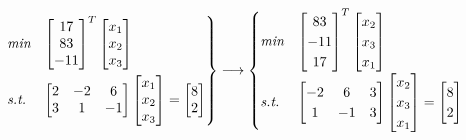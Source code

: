 \begin{enumerate}
	\begin{gather*}
		\begin{rcases}
			\textit{min} & \begin{bmatrix}
				17\\83\\-11
			\end{bmatrix}^T\begin{bmatrix}
				x_1\\ x_2\\x_3
			\end{bmatrix}\\
			\textit{s.t.} & \begin{bmatrix}
				2 & -2 & 6\\
				3 & 1 & -1
			\end{bmatrix}
			\begin{bmatrix}
				x_1\\x_2\\x_3
			\end{bmatrix} = \begin{bmatrix}
				8\\2
			\end{bmatrix}
		\end{rcases} \longrightarrow
		\begin{cases}
			\textit{min} & \begin{bmatrix}
				83\\-11\\17
			\end{bmatrix}^T\begin{bmatrix}
				x_2\\x_3\\x_1
			\end{bmatrix}\\
			\textit{s.t.} & \begin{bmatrix}
				-2 & 6 & 3\\
				1 & -1 & 3
			\end{bmatrix}
			\begin{bmatrix}
				x_2\\x_3\\x_1
			\end{bmatrix} = \begin{bmatrix}
				8\\2
			\end{bmatrix}
		\end{cases}
	\end{gather*}
\end{enumerate}